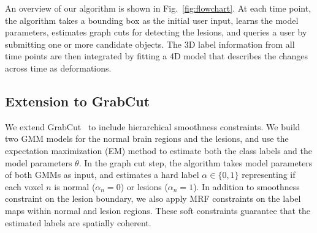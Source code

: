 \documentclass{article}
\begin{document}
An overview of our algorithm is shown in Fig.~\ref{fig:flowchart}.
At each time point, the algorithm takes a bounding box as the initial
user input, learns the model parameters, estimates graph cuts for detecting
the lesions, and queries a user by submitting one or more candidate objects.
The 3D label information from all time points are then integrated
by fitting a 4D model that describes the changes across time as deformations.

\subsection{Extension to GrabCut}
We extend GrabCut~\cite{boykov2001fast,rother2004grabcut} to include
hierarchical smoothness constraints. We build two GMM models for the normal
brain regions and the lesions, and use the expectation maximization (EM) method
to estimate both the class labels and the model parameters $\theta$. In the
graph cut step, the algorithm takes model parameters of both GMMs as input, and
estimates a hard label $\alpha \in \{0, 1\}$ representing if each voxel $n$ is
normal ($\alpha_n =0 $) or lesions ($\alpha_n = 1$). In addition to smoothness
constraint on the lesion boundary, we also apply MRF constraints on the label
maps within normal and lesion regions. These soft constraints guarantee that
the estimated labels are spatially coherent.
\end{document}

